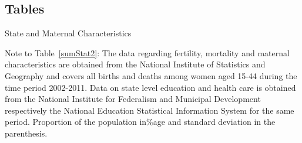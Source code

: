 \documentclass[a4paper, 11pt]{article}
\begin{document}
\begin{spacing}{2}


\section*{Tables}
\begin{table}[H]\caption{State and Maternal Characteristics}\label{sumStat2}
\begin{threeparttable}
{\small }
\begin{tablenotes}
{\scriptsize \item Note to Table~\ref{sumStat2}:	The data regarding fertility, mortality and maternal characteristics are obtained from the National Institute of Statistics and Geography and covers all births and deaths among women aged 15-44 during the time period 2002-2011. Data on state level education and health care is obtained from the National Institute for Federalism and Municipal Development respectively the National Education Statistical Information System for the same period. Proportion of the population in\%age and standard deviation in the parenthesis.}
\end{tablenotes}
\end{threeparttable}
\end{table}




\end{spacing}
\end{document}
